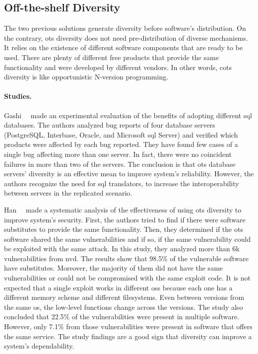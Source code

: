 \subsection{Off-the-shelf Diversity}
The two previous solutions generate diversity before software’s distribution. 
On the contrary, \gls{ots} diversity does not need pre-distribution of diverse mechanisms. 
It relies on the existence of different software components that are ready to be used.
There are plenty of different free products that provide the same functionality and were developed by different vendors. 
In other words, \gls{cots} diversity is like opportunistic N-version programming.


\paragraph{Studies.}
Gashi~\etal{}~\cite{Gashi:2007} made an experimental evaluation of the benefits of adopting different \gls{sql} databases. 
The authors analyzed bug reports of four database servers (PostgreSQL, Interbase, Oracle, and Microsoft \gls{sql} Server) and verified which products were affected by each bug reported. 
They have found few cases of a single bug affecting more than one server. 
In fact, there were no coincident failures in more than two of the servers.
The conclusion is that \gls{ots} database servers’ diversity is an effective mean to improve system's reliability. 
However, the authors recognize the need for \gls{sql} translators, to increase the interoperability between servers in the replicated scenario.

Han~\etal{}~\cite{Han:2009} made a systematic analysis of the effectiveness of using \gls{ots} diversity to improve system's security. 
First, the authors tried to find if there were software substitutes to provide the same functionality. 
Then, they determined if the \gls{ots} software shared the same vulnerabilities and if so, if the same vulnerability could be exploited with the same attack. 
In this study, they analyzed more than 6k vulnerabilities from \gls{nvd}. 
The results show that 98.5$\%$ of the vulnerable software have substitutes. 
Moreover, the majority of them did not have the same vulnerabilities or could not be compromised with the same exploit code. 
It is not expected that a single exploit works in different \glspl{os} because each one has a different memory scheme and different filesystems. 
Even between versions from the same \gls{os}, the low-level functions change across the versions. 
The study also concluded that 22.5$\%$ of the vulnerabilities were present in multiple software. 
However, only 7.1$\%$ from those vulnerabilities were present in software that offers the same service. 
The study findings are a good sign that diversity can improve a system’s dependability.


